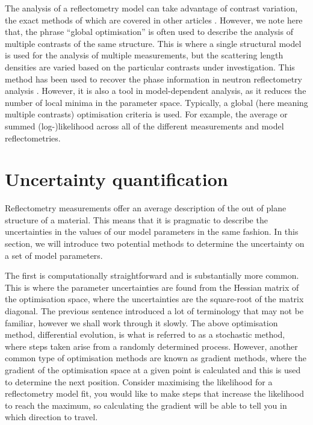 \documentclass[
 reprint,
 superscriptaddress,
 amsmath,amssymb,
 aps,
]{revtex4-1}
\begin{document}
The analysis of a reflectometry model can take advantage of contrast variation, the exact methods of which are covered in other articles \cite{schurtenberger_contrast_2002}.
However, we note here that, the phrase ``global optimisation'' is often used to describe the analysis of multiple contrasts of the same structure.
This is where a single structural model is used for the analysis of multiple measurements, but the scattering length densities are varied based on the particular contrasts under investigation.
This method has been used to recover the phase information in neutron reflectometry analysis \cite{majkrzak_exact_1995,majkrzak_first_2000,majkrzak_phase_2003,koutsioubas_model_2019}.
However, it is also a tool in model-dependent analysis, as it reduces the number of local minima in the parameter space.
Typically, a global (here meaning multiple contrasts) optimisation criteria is used.
For example, the average or summed (log-)likelihood across all of the different measurements and model reflectometries.

\section{Uncertainty quantification}
Reflectometry measurements offer an average description of the out of plane structure of a material.
This means that it is pragmatic to describe the uncertainties in the values of our model parameters in the same fashion.
In this section, we will introduce two potential methods to determine the uncertainty on a set of model parameters.

The first is computationally straightforward and is substantially more common.
This is where the parameter uncertainties are found from the Hessian matrix of the optimisation space, where the uncertainties are the square-root of the matrix diagonal.
The previous sentence introduced a lot of terminology that may not be familiar, however we shall work through it slowly.
The above optimisation method, differential evolution, is what is referred to as a stochastic method, where steps taken arise from a randomly determined process.
However, another common type of optimisation methods are known as gradient methods, where the gradient of the optimisation space at a given point is calculated and this is used to determine the next position.
Consider maximising the likelihood for a reflectometry model fit, you would like to make steps that increase the likelihood to reach the maximum, so calculating the gradient will be able to tell you in which direction to travel.
\end{document}

